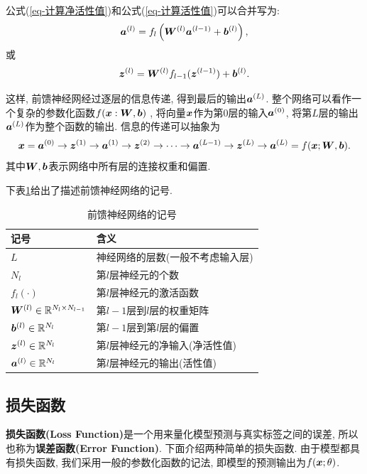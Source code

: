 \documentclass[12pt, a4paper, oneside]{ctexart}
\begin{document}
公式(\ref{eq-计算净活性值})和公式(\ref{eq-计算活性值})可以合并写为:
\begin{equation*}
    \boldsymbol{a}^{(l)}=f_l\left(\boldsymbol{W}^{(l)}\boldsymbol{a}^{(l-1)}+\boldsymbol{b}^{(l)}\right),
\end{equation*}
或
\begin{equation}
    \boldsymbol{z}^{(l)}=\boldsymbol{W}^{(l)}f_{l-1}(\boldsymbol{z}^{(l-1)})+\boldsymbol{b}^{(l)}.
\end{equation}

这样, 前馈神经网经过逐层的信息传递, 得到最后的输出$\boldsymbol{a}^{(L)}$. 整个网络可以看作一个复杂的参数化函数$f(\boldsymbol{x}:\boldsymbol{W}, \boldsymbol{b})$ , 将向量$\boldsymbol{x}$作为第$0$层的输入$\boldsymbol{a}^{(0)}$, 将第$L$层的输出$\boldsymbol{a}^{(L)}$作为整个函数的输出. 信息的传递可以抽象为
\begin{equation}
    \boldsymbol{x}=\boldsymbol{a}^{(0)}\rightarrow \boldsymbol{z}^{(1)}\rightarrow \boldsymbol{a}^{(1)}\rightarrow \boldsymbol{z}^{(2)}\rightarrow \cdots\rightarrow \boldsymbol{a}^{(L-1)}\rightarrow \boldsymbol{z}^{(L)}\rightarrow\boldsymbol{a}^{(L)}=f(\boldsymbol{x};\boldsymbol{W},\boldsymbol{b}).
\end{equation}
其中$\boldsymbol{W},\boldsymbol{b}$表示网络中所有层的连接权重和偏置.

下表\ref{table-前馈神经网络}给出了描述前馈神经网络的记号.
\renewcommand\arraystretch{1}
\begin{table}[!htbp] %
    \centering %
    \caption{前馈神经网络的记号}\label{table-前馈神经网络}
    \begin{tabular}{p{4cm}p{7cm}} %
        \toprule
        记号 & 含义\\
        \midrule
        $L$ & 神经网络的层数(一般不考虑输入层)\\
        $N_l$ & 第$l$层神经元的个数\\
        $f_l(\cdot)$ & 第$l$层神经元的激活函数\\
        $\boldsymbol{W}^{(l)}\in\mathbb{R}^{N_l\times N_{l-1}}$ & 第$l-1$层到$l$层的权重矩阵\\
        $\boldsymbol{b}^{(l)}\in\mathbb{R}^{N_l}$ & 第$l-1$层到第$l$层的偏置\\
        $\boldsymbol{z}^{(l)}\in\mathbb{R}^{N_l}$ & 第$l$层神经元的净输入(净活性值)\\
        $\boldsymbol{a}^{(l)}\in\mathbb{R}^{N_l}$ & 第$l$层神经元的输出(活性值)\\
        \bottomrule
    \end{tabular}
\end{table}
\subsection{损失函数}
\textbf{损失函数(Loss Function)}是一个用来量化模型预测与真实标签之间的误差, 所以也称为\textbf{误差函数(Error Function)}. 下面介绍两种简单的损失函数. 由于模型都具有损失函数, 我们采用一般的参数化函数的记法, 即模型的预测输出为$f(\boldsymbol{x};\theta)$.
\end{document}

